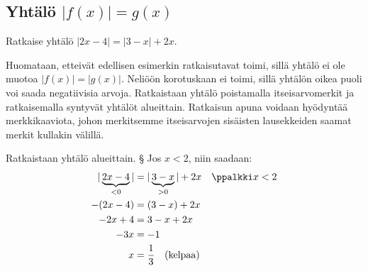 \subsection*{Yhtälö $|f(x)|=g(x)$}

\begin{esimerkki}
	Ratkaise yhtälö $|2x-4|=|3-x|+2x$.
	\begin{esimratk}
		Huomataan, etteivät edellisen esimerkin ratkaisutavat toimi, sillä yhtälö ei ole muotoa $|f(x)|=|g(x)|$. Neliöön korotuskaan ei toimi, sillä yhtälön oikea puoli voi saada negatiivisia arvoja. Ratkaistaan yhtälö poistamalla itseisarvomerkit ja ratkaisemalla syntyvät yhtälöt alueittain. Ratkaisun apuna voidaan hyödyntää merkkikaaviota, johon merkitsemme itseisarvojen sisäisten lausekkeiden saamat merkit kullakin välillä.

		\begin{lukusuora}{0}{4}{4}
		\end{lukusuora}
		\begin{lukusuora}{1}{5}{4}
		\end{lukusuora}
		
		\begin{center}
			\begin{merkkikaavio}{2}

				\merkkikaavioMerkki{$-$}
				\merkkikaavioMerkki{$+$}
				\merkkikaavioMerkki{$+$}

			\merkkikaavioUusirivi
				\merkkikaavioMerkki{$+$}
				\merkkikaavioMerkki{$+$}
				\merkkikaavioMerkki{$-$}
			\end{merkkikaavio}
		\end{center}
		
		Ratkaistaan yhtälö alueittain.
		\vaiheet
			§ Jos $x<2$, niin saadaan:
				\begin{align*}
					|\underbrace{2x-4}_{<0}|&=|\underbrace{3-x}_{>0}|+2x \quad \ppalkki x<2  \\
					-(2x-4)&=(3-x)+2x \\
					-2x+4&=3-x+2x \\
					-3x &= -1 \\
					x &= \frac{1}{3} \quad \text{(kelpaa)}
				\end{align*}


\end{esimratk}
\end{esimerkki}
